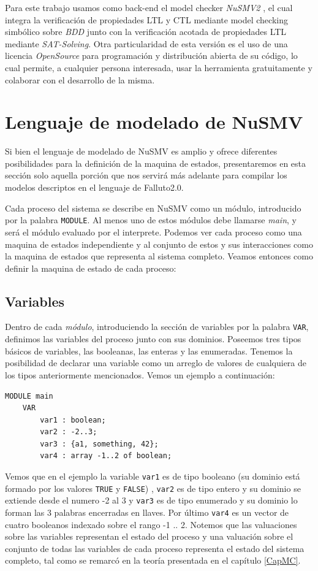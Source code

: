 \documentclass[pdftex,a4paper,12pt]{book}
\begin{document}
Para este trabajo usamos como back-end el model checker \textit{NuSMV2} \cite{NuSMV2}, el cual integra la verificaci\'on de propiedades LTL y CTL mediante model checking simb\'olico sobre \textit{BDD} junto con la verificaci\'on acotada de propiedades LTL mediante \textit{SAT-Solving}. Otra particularidad de esta versi\'on es el uso de una licencia \textit{OpenSource} para programaci\'on y distribuci\'on abierta de su c\'odigo, lo cual permite, a cualquier persona interesada, usar la herramienta gratuitamente y colaborar con el desarrollo de la misma.


\section{Lenguaje de modelado de NuSMV}
Si bien el lenguaje de modelado de NuSMV es amplio y ofrece diferentes posibilidades para la definici\'on de la maquina de estados, presentaremos en esta secci\'on solo aquella porci\'on que nos servir\'a m\'as adelante para compilar los modelos descriptos en el lenguaje de Falluto2.0.

Cada proceso del sistema se describe en NuSMV como un m\'odulo, introducido por la palabra \texttt{MODULE}. Al menos uno de estos m\'odulos debe llamarse \textit{main}, y ser\'a el m\'odulo evaluado por el interprete. Podemos ver cada proceso como una maquina de estados independiente y al conjunto de estos y sus interacciones como la maquina de estados que representa al sistema completo. Veamos entonces como definir la maquina de estado de cada proceso:

\subsection*{Variables}

Dentro de cada \textit{m\'odulo}, introduciendo la secci\'on de variables por la palabra \texttt{VAR}, definimos las variables del proceso junto con sus dominios. Poseemos tres tipos b\'asicos de variables, las booleanas, las enteras y las enumeradas. Tenemos la posibilidad de declarar una variable como un arreglo de valores de cualquiera de los tipos anteriormente mencionados. Vemos un ejemplo a continuaci\'on:
\begin{verbatim}
MODULE main
    VAR
        var1 : boolean;
        var2 : -2..3;
        var3 : {a1, something, 42};
        var4 : array -1..2 of boolean;
\end{verbatim}
Vemos que en el ejemplo la variable \texttt{var1} es de tipo booleano (su dominio est\'a formado por los valores \texttt{TRUE} y \texttt{FALSE}) , \texttt{var2} es de tipo entero y su dominio se extiende desde el numero -2 al 3 y \texttt{var3} es de tipo enumerado y su dominio lo forman las 3 palabras encerradas en llaves. Por \'ultimo \texttt{var4} es un vector de cuatro booleanos indexado sobre el rango -1 .. 2. Notemos que las valuaciones sobre las variables representan el estado del proceso y una valuaci\'on sobre el conjunto de todas las variables de cada proceso representa el estado del sistema completo, tal como se remarc\'o en la teor\'ia presentada en el cap\'itulo \ref{CapMC}.
\end{document}
